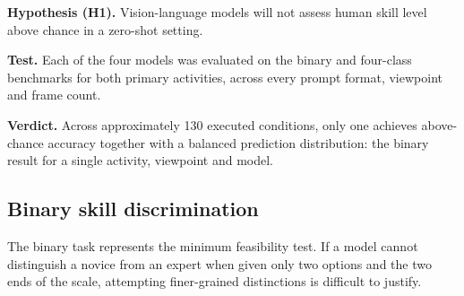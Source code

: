 \documentclass[logo,msc]{infthesis}
\newcommand{\runin}[1]{\par\medskip\noindent\textbf{#1}}
\begin{document}
\runin{Hypothesis (H1).} Vision-language models will not assess human
skill level above chance in a zero-shot setting.

\runin{Test.} Each of the four models was evaluated on the binary and
four-class benchmarks for both primary activities, across every prompt
format, viewpoint and frame count.

\runin{Verdict.} Across approximately 130 executed conditions, only one
achieves above-chance accuracy together with a balanced prediction
distribution: the binary result for a single activity, viewpoint and
model.

\subsection{Binary skill discrimination}

The binary task represents the minimum feasibility test. If a model cannot
distinguish a novice from an expert when given only two options and the two
ends of the scale, attempting finer-grained distinctions is difficult to
justify.

\begin{table}[H]
\centering
\caption{Binary results, climbing (Novice against Expert, balanced
$n = 50$, chance $= 50\%$).}
\label{tab:binary-climbing}
\footnotesize
{}
\end{table}
\end{document}

